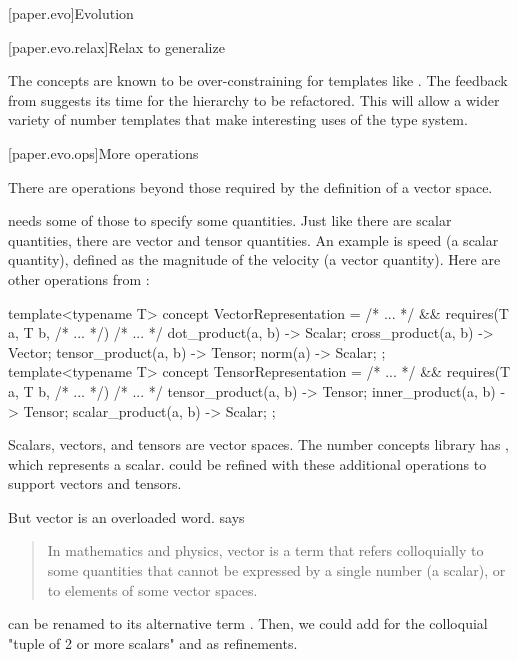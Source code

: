 

[paper.evo]{Evolution}

[paper.evo.relax]{Relax to generalize}

\pnum
The concepts are known to be over-constraining for templates like .
The feedback from \hrefVII{} suggests its time for the hierarchy to be refactored.
This will allow a wider variety of number templates that make interesting uses of the type system.

[paper.evo.ops]{More operations}

\pnum
There are operations beyond those required by the definition of a vector space.

\pnum
{} needs some of those to specify some quantities.
Just like there are scalar quantities, there are vector and tensor quantities.
An example is speed (a scalar quantity),
defined as the magnitude of the velocity (a vector quantity).
Here are other operations from \hrefXI{}:
\begin{codeblock}
template<typename T>
concept VectorRepresentation = /* ... */ &&
  requires(T a, T b, /* ... */) {
    /* ... */
    { dot_product(a, b) } -> Scalar;
    { cross_product(a, b) } -> Vector;
    { tensor_product(a, b) } -> Tensor;
    { norm(a) } -> Scalar;
  };
template<typename T>
concept TensorRepresentation = /* ... */ &&
  requires(T a, T b, /* ... */) {
    /* ... */
    { tensor_product(a, b) } -> Tensor;
    { inner_product(a, b) } -> Tensor;
    { scalar_product(a, b) } -> Scalar;
  };
\end{codeblock}

\pnum
Scalars, vectors, and tensors are vector spaces.
The number concepts library has , which represents a scalar.
 could be refined with these additional operations to support vectors and tensors.

\pnum
But vector is an overloaded word.
 says
\begin{quote}
In mathematics and physics,
vector is a term that refers colloquially to some quantities
that cannot be expressed by a single number (a scalar),
or to elements of some vector spaces.
\end{quote}
 can be renamed to its alternative term .
Then, we could add  for the colloquial "tuple of 2 or more scalars" and  as refinements.

